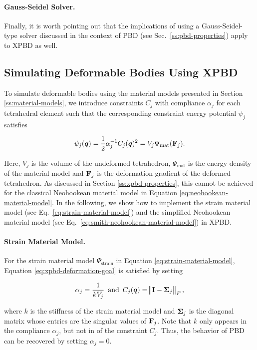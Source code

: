 \paragraph{Gauss-Seidel Solver.}
Finally, it is worth pointing out that the implications of using a Gauss-Seidel-type solver discussed in the context of PBD 
(see Sec.\ \ref{ss:pbd-properties}) apply to XPBD as well.

\subsection{Simulating Deformable Bodies Using XPBD}\label{ss:xpbd-deformable-bodies}
To simulate deformable bodies using the material models presented in Section \ref{ss:material-models}, we introduce constraints $C_j$ with 
compliance $\alpha_j$ for each tetrahedral element such that the corresponding constraint energy 
potential $\psi_j$ satisfies

\begin{equation}\label{eq:xpbd-deformation-goal}
    \psi_j(\bm{q}) = \frac{1}{2}\alpha^{-1}_jC_j(\bm{q})^2 = V_j\Psi_{\text{mat}}(\mathbf{F}_j).
\end{equation}

\noindent Here, $V_j$ is the volume of the undeformed tetrahedron, $\Psi_{\text{mat}}$ is the energy density of the material 
model and $\mathbf{F}_j$ is the deformation gradient of the deformed tetrahedron. As discussed in Section \ref{ss:xpbd-properties}, this 
cannot be achieved for the classical Neohookean material model in Equation \ref{eq:neohookean-material-model}. In the following, we show 
how to implement the strain material model (see Eq.\ \ref{eq:strain-material-model}) and the simplified Neohookean material model 
(see Eq.\ \ref{eq:smith-neohookean-material-model}) in XPBD.

\paragraph{Strain Material Model.}
For the strain material model $\Psi_{\text{strain}}$ in Equation \ref{eq:strain-material-model}, Equation \ref{eq:xpbd-deformation-goal} is 
satisfied by setting 

\[
    \alpha_j = \frac{1}{k V_j} \, \, \, \text{and} \, \, \, C_j(\bm{q}) = \norm{\mathbf{I} - \mathbf{\Sigma}_j}_F,
\]

\noindent where $k$ is the stiffness of the strain material model and $\mathbf{\Sigma}_j$ is the diagonal matrix whose entries 
are the singular values of $\mathbf{F}_j$. Note that $k$ only appears in the compliance $\alpha_j$, but not in of the constraint 
$C_j$. Thus, the behavior of PBD can be recovered by setting $\alpha_j = 0$.

